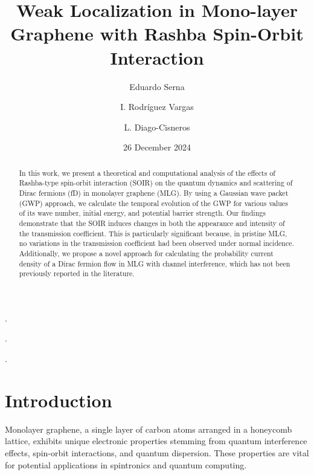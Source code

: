 \documentclass[twocolumn]{revtex4-2}
\begin{document}
    \title{Weak Localization in Mono-layer Graphene with Rashba Spin-Orbit Interaction}
    \author{Eduardo Serna}
    .
    \author{I. Rodríguez Vargas}
    .
    \author{L. Diago-Cisneros}
    .
    \date{26 December 2024}
    \maketitle

    \begin{abstract}

        In this work, we present a theoretical and computational analysis of the effects of Rashba-type spin-orbit interaction (SOIR) on the quantum dynamics and scattering of Dirac fermions (fD) in monolayer graphene (MLG). By using a Gaussian wave packet (GWP) approach, we calculate the temporal evolution of the GWP for various values of its wave number, initial energy, and potential barrier strength.
        Our findings demonstrate that the SOIR induces changes in both the appearance and intensity of the transmission coefficient.
        This is particularly significant because, in pristine MLG, no variations in the transmission coefficient had been observed under normal incidence.
        Additionally, we propose a novel approach for calculating the probability current density of a Dirac fermion flow in MLG with channel interference, which has not been previously reported in the literature.
    \end{abstract}


    \section{Introduction}\label{sec:introduction}

        Monolayer graphene, a single layer of carbon atoms arranged in a honeycomb lattice, exhibits unique electronic properties stemming from quantum interference effects, spin-orbit interactions, and quantum dispersion.
        These properties are vital for potential applications in spintronics and quantum computing.
\end{document}
